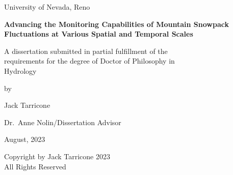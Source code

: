 \documentclass[11pt, oneside, openany]{scrbook}
\begin{document}
\begin{titlepage}
\begin{center}
\vspace*{1in}
University of Nevada, Reno

\vspace{1.5in}
\textbf{Advancing the Monitoring Capabilities of Mountain Snowpack Fluctuations at Various Spatial and Temporal Scales}

\vspace{1in}
A dissertation submitted in partial fulfillment of the \\
requirements for the degree of Doctor of Philosophy in \\
Hydrology 

\vspace{1in}
by

\vspace{1em}
Jack Tarricone

\vspace{2em}
Dr.~Anne Nolin/Dissertation Advisor

\vspace{3em}
August, 2023

\end{center}
\end{titlepage}
\thispagestyle{empty}
\begin{center}
\vspace*{\fill}
Copyright by Jack Tarricone 2023 \\
All Rights Reserved
\vspace*{\fill}
\end{center}
\end{document}
